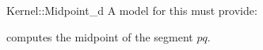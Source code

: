 \begin{ccRefFunctionObjectConcept}{Kernel::Midpoint_d}
A model for this must provide:


{computes the midpoint of the segment $pq$.}

\end{ccRefFunctionObjectConcept}
